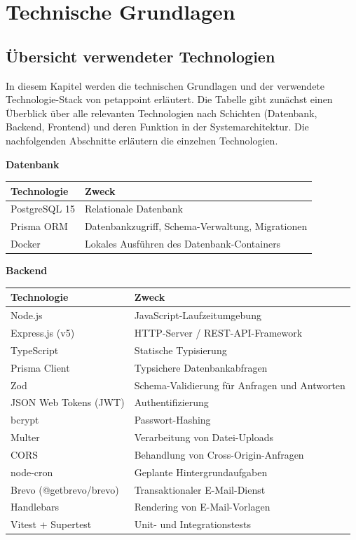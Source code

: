 \chapter{Technische Grundlagen}

\section{Übersicht verwendeter Technologien}

In diesem Kapitel werden die technischen Grundlagen und der verwendete Technologie-Stack von petappoint erläutert. Die Tabelle gibt zunächst einen Überblick über alle relevanten Technologien nach Schichten  (Datenbank, Backend, Frontend) und deren Funktion in der Systemarchitektur. Die nachfolgenden Abschnitte erläutern die einzelnen Technologien.

\textbf{Datenbank}

\begin{tabular}{|p{5cm}|p{}|}
\hline
\textbf{Technologie} & \textbf{Zweck} \\
\hline
PostgreSQL 15 & Relationale Datenbank \\
\hline
Prisma ORM & Datenbankzugriff, Schema-Verwaltung, Migrationen \\
\hline
Docker & Lokales Ausführen des Datenbank-Containers \\
\hline
\end{tabular}

\vspace{1em}

\textbf{Backend}

\begin{tabular}{|p{5cm}|p{}|}
\hline
\textbf{Technologie} & \textbf{Zweck} \\
\hline
Node.js & JavaScript-Laufzeitumgebung \\
\hline
Express.js (v5) & HTTP-Server / REST-API-Framework \\
\hline
TypeScript & Statische Typisierung \\
\hline
Prisma Client & Typsichere Datenbankabfragen \\
\hline
Zod & Schema-Validierung für Anfragen und Antworten \\
\hline
JSON Web Tokens (JWT) & Authentifizierung \\
\hline
bcrypt & Passwort-Hashing \\
\hline
Multer & Verarbeitung von Datei-Uploads \\
\hline
CORS & Behandlung von Cross-Origin-Anfragen \\
\hline
node-cron & Geplante Hintergrundaufgaben \\
\hline
Brevo (@getbrevo/brevo) & Transaktionaler E-Mail-Dienst \\
\hline
Handlebars & Rendering von E-Mail-Vorlagen \\
\hline
Vitest + Supertest & Unit- und Integrationstests \\
\hline
\end{tabular}

